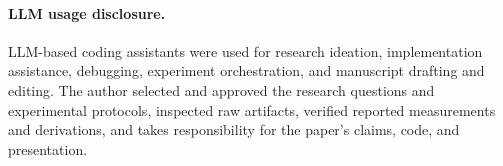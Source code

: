 \paragraph{LLM usage disclosure.}
\label{app:llm-usage}

LLM-based coding assistants were used for research ideation, implementation
assistance, debugging, experiment orchestration, and manuscript drafting and
editing.  The author selected and approved the research questions and
experimental protocols, inspected raw artifacts, verified reported
measurements and derivations, and takes responsibility for the paper's
claims, code, and presentation.


\FloatBarrier


